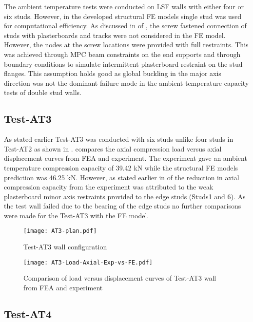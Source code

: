 The ambient temperature tests were conducted on LSF walls with either four or six studs. However, in the developed structural FE models single stud was used for computational efficiency. As discussed in  of , the screw fastened connection of studs with plasterboards and tracks were not considered in the FE model. However, the nodes at the screw locations were provided with full restraints. This was achieved through MPC beam constraints on the end supports and through boundary conditions to simulate intermittent plasterboard restraint on the stud flanges. This assumption holds good as global buckling in the major axis direction was not the dominant failure mode in the ambient temperature capacity tests of double stud walls.

\subsection*{Test-AT3}

As stated earlier Test-AT3 was conducted with six studs unlike four studs in Test-AT2 as shown in .  compares the axial compression load versus axial displacement curves from FEA and experiment. The experiment gave an ambient temperature compression capacity of 39.42 kN while the structural FE models prediction was 46.25 kN. However, as stated earlier in  of  the reduction in axial compression capacity from the experiment was attributed to the weak plasterboard minor axis restraints provided to the edge studs (Studs1 and 6). As the test wall failed due to the bearing of the edge studs no further comparisons were made for the Test-AT3 with the FE model.   
\begin{figure}[!htbp]
	\centering
			\texttt{[image: AT3-plan.pdf]}\\
		\caption{Test-AT3 wall configuration}
		\label{fig:AT3-plan-fea}
\end{figure}
\begin{figure}[!htbp]
	\centering
			\texttt{[image: AT3-Load-Axial-Exp-vs-FE.pdf]}\\
		\caption{Comparison of load versus displacement curves of Test-AT3 wall from FEA and experiment}
		\label{fig:AT3-fea}
\end{figure}

\subsection*{Test-AT4}

